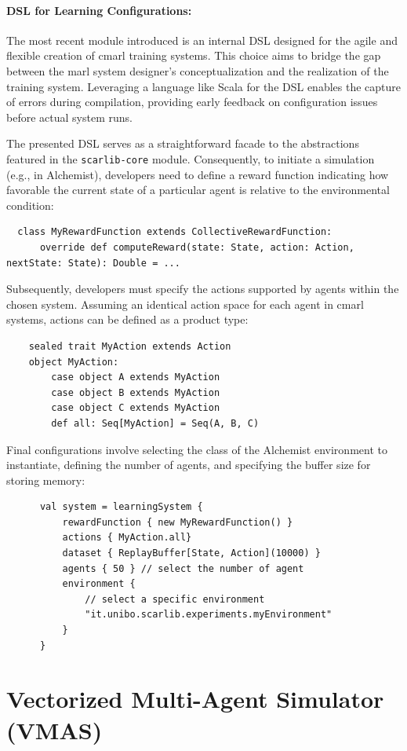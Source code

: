 \documentclass[12pt,a4paper,openright,twoside]{book}
\begin{document}
\paragraph{DSL for Learning Configurations:} The most recent module introduced is an internal DSL designed for the agile and flexible creation of \ac{cmarl} training systems. This choice aims to bridge the gap between the \ac{marl} system designer's conceptualization and the realization of the training system. Leveraging a language like Scala for the DSL enables the capture of errors during compilation, providing early feedback on configuration issues before actual system runs.

The presented DSL serves as a straightforward facade to the abstractions featured in the \texttt{scarlib-core} module. Consequently, to initiate a simulation (e.g., in Alchemist), developers need to define a reward function indicating how favorable the current state of a particular agent is relative to the environmental condition:
\begin{lstlisting}
  class MyRewardFunction extends CollectiveRewardFunction:
      override def computeReward(state: State, action: Action, nextState: State): Double = ...
  \end{lstlisting}
  Subsequently, developers must specify the actions supported by agents within the chosen system. Assuming an identical action space for each agent in \ac{cmarl} systems, actions can be defined as a product type:
  \begin{lstlisting}
    sealed trait MyAction extends Action
    object MyAction:
        case object A extends MyAction
        case object B extends MyAction
        case object C extends MyAction
        def all: Seq[MyAction] = Seq(A, B, C)
    \end{lstlisting}
    Final configurations involve selecting the class of the Alchemist environment to instantiate, defining the number of agents, and specifying the buffer size for storing memory:
    \begin{lstlisting}
      val system = learningSystem {
          rewardFunction { new MyRewardFunction() }
          actions { MyAction.all}
          dataset { ReplayBuffer[State, Action](10000) }
          agents { 50 } // select the number of agent
          environment {
              // select a specific environment
              "it.unibo.scarlib.experiments.myEnvironment"
          }
      }
      \end{lstlisting}
\section{Vectorized Multi-Agent Simulator (VMAS)}
\end{document}
